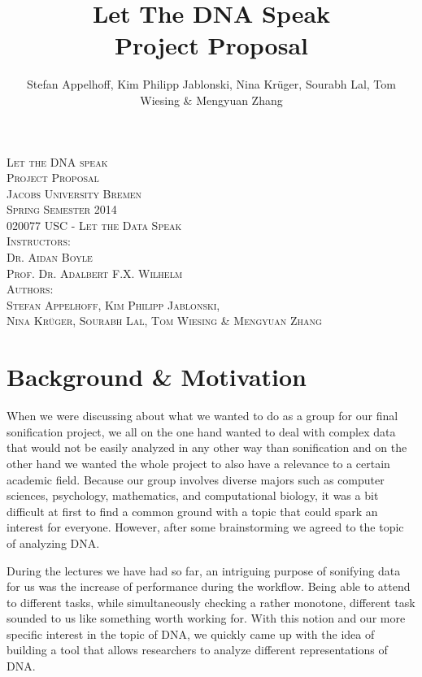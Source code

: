 \documentclass[10pt]{article}
\title{Let The DNA Speak\\Project Proposal}
\author{Stefan Appelhoff, Kim Philipp Jablonski, Nina Krüger, Sourabh Lal, Tom Wiesing \& Mengyuan Zhang}
\begin{document}
\begin{titlepage}
\thispagestyle{empty}
\begin{center}

\textsc{\Huge Let the DNA speak}\\[2 cm]
\textsc{\Huge Project Proposal}\\[7cm]

\textsc{\Large Jacobs University Bremen\\
Spring Semester 2014\\020077 USC - Let the Data Speak}\\[2 cm]

\textsc{\Large Instructors:\\Dr. Aidan Boyle\\Prof. Dr. Adalbert F.X. Wilhelm}\\[1 cm]

\textsc{\Large Authors:\\Stefan Appelhoff, Kim Philipp Jablonski, \\Nina Krüger, Sourabh Lal, Tom Wiesing \& Mengyuan Zhang}

\end{center}

\end{titlepage}


\clearpage
\thispagestyle{empty}
\tableofcontents
\newpage

\setcounter{page}{1}
\section{Background \& Motivation}

When we were discussing about what we wanted to do as a group for our final sonification project, we all on the one hand wanted to deal with complex data that would not be easily analyzed in any other way than sonification and on the other hand we wanted the whole project to also have a relevance to a certain academic field. Because our group involves diverse majors such as computer sciences, psychology, mathematics, and computational biology, it was a bit difficult at first to find a common ground with a topic that could spark an interest for everyone. However, after some brainstorming we agreed to the topic of analyzing DNA.

During the lectures we have had so far, an intriguing purpose of sonifying data for us was the increase of performance during the workflow. Being able to attend to different tasks, while simultaneously checking a rather monotone, different task sounded to us like something worth working for. With this notion and our more specific interest in the topic of DNA, we quickly came up with the idea of building a tool that allows researchers to analyze different representations of DNA.
\end{document}
